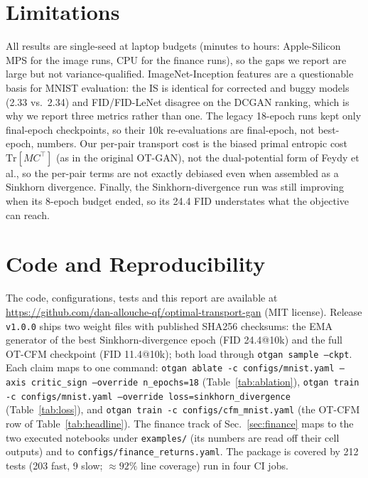 \documentclass[10pt,twocolumn]{article}
\begin{document}
\section{Limitations}
All results are single-seed at laptop budgets (minutes to hours: Apple-Silicon MPS for
the image runs, CPU for the finance runs), so the gaps we report are large but not
variance-qualified. ImageNet-Inception features are a
questionable basis for MNIST evaluation: the IS is identical for corrected and buggy
models (2.33 vs.\ 2.34) and FID/FID-LeNet disagree on the DCGAN ranking, which is why we
report three metrics rather than one. The legacy 18-epoch runs kept only final-epoch
checkpoints, so their 10k re-evaluations are final-epoch, not best-epoch, numbers. Our
per-pair transport cost is the biased primal entropic cost $\mathrm{Tr}[MC^\top]$ (as in
the original OT-GAN), not the dual-potential form of Feydy et al., so the per-pair terms
are not exactly debiased even when assembled as a Sinkhorn divergence. Finally, the
Sinkhorn-divergence run was still improving when its 8-epoch budget ended, so its 24.4 FID
understates what the objective can reach.

\section{Code and Reproducibility}
The code, configurations, tests and this report are available at
\url{https://github.com/dan-allouche-qf/optimal-transport-gan} (MIT license). Release
\texttt{v1.0.0} ships two weight files with published SHA256 checksums: the EMA generator
of the best Sinkhorn-divergence epoch (FID 24.4@10k) and the full OT-CFM checkpoint (FID
11.4@10k); both load through \texttt{otgan sample --ckpt}. Each claim maps to one command:
\texttt{otgan ablate -c configs/mnist.yaml --axis critic\_sign --override n\_epochs=18}
(Table~\ref{tab:ablation}),
\texttt{otgan train -c configs/mnist.yaml --override loss=sinkhorn\_divergence}
(Table~\ref{tab:loss}), and \texttt{otgan train -c configs/cfm\_mnist.yaml} (the OT-CFM
row of Table~\ref{tab:headline}). The finance track of Sec.~\ref{sec:finance} maps to
the two executed notebooks under \texttt{examples/} (its numbers are read off their
cell outputs) and to \texttt{configs/finance\_returns.yaml}. The package is covered by
212 tests (203 fast, 9 slow;
$\approx 92\%$ line coverage) run in four CI jobs.
\end{document}
